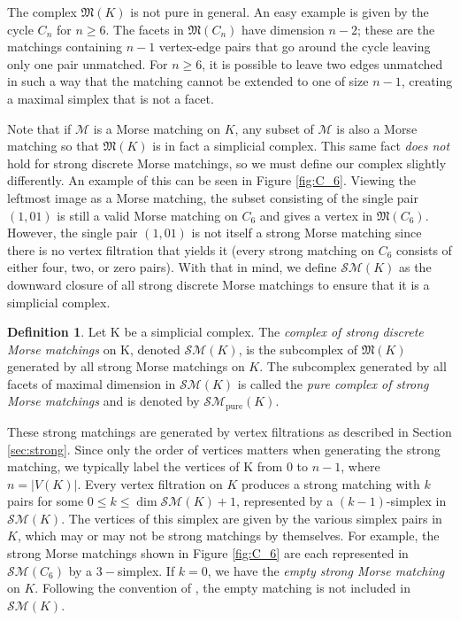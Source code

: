 \documentclass{amsart}
\theoremstyle{definition}
\newtheorem{definition}[theorem]{Definition}
\newcommand{\sm}{{\mathcal{SM}}}
\newcommand{\smpure}{{\mathcal{SM}}_{\textrm{pure}}}
\begin{document}
The complex ${\mathfrak M}(K)$ is not pure in general. An easy example is given by the cycle $C_n$ for $n\ge 6$. The facets in ${\mathfrak M}(C_n)$ have dimension $n-2$; these are the matchings containing $n-1$ vertex-edge pairs that go around the cycle leaving only one pair unmatched. For $n\ge 6$, it is possible to leave two edges unmatched in such a way that the matching cannot be extended to one of size $n-1$, creating a maximal simplex that is not a facet. 

Note that if ${\mathcal M}$ is a Morse matching on $K$, any subset of ${\mathcal M}$ is also a Morse matching so that $\mathfrak{M}(K)$ is in fact a simplicial complex. This same fact {\em does not} hold for strong discrete Morse matchings, so we must define our complex slightly differently. An example of this can be seen in Figure \ref{fig:C_6}. Viewing the leftmost image as a Morse matching, the subset consisting of the single pair $(1,01)$ is still a valid Morse matching on $C_6$ and gives a vertex in ${\mathfrak M}(C_6)$. However, the single pair $(1,01)$ is not itself a strong Morse matching since there is no vertex filtration that yields it (every strong matching on $C_6$ consists of either four, two, or zero pairs). With that in mind, we define $\sm(K)$ as the downward closure of all strong discrete Morse matchings to ensure that it is a simplicial complex.

\begin{definition}\label{smdef}
Let K be a simplicial complex. The \textit{complex of strong discrete Morse matchings} on K, denoted $\mathcal{SM}(K)$, is the subcomplex of ${\mathfrak M}(K)$ generated by all strong  Morse matchings on $K$. The subcomplex generated by all facets of maximal dimension in $\sm(K)$ is called the {\em pure complex of strong Morse matchings} and is denoted by $\smpure(K)$. 
\end{definition}

These strong matchings are generated by vertex filtrations as described in Section \ref{sec:strong}. Since only the order of vertices matters when generating the strong matching, we typically label the vertices of K from $0$ to $n-1$, where $n=|V(K)|$. Every vertex filtration on $K$ produces a strong matching with $k$ pairs for some $0\leq k\leq \dim\sm(K)+1$, represented by a $(k-1)$-simplex in $\sm(K)$. The vertices of this simplex are given by the various simplex pairs in $K$, which may or may not be strong matchings by themselves. For example, the strong Morse matchings shown in Figure \ref{fig:C_6} are each  represented in $\sm(C_6)$ by a $3-$simplex. If $k=0$, we have the \textit{empty strong Morse matching} on $K$. Following the convention of \cite{ChariJoswig2005}, the empty matching is not included in $\mathcal{SM}(K)$. 
\end{document}
